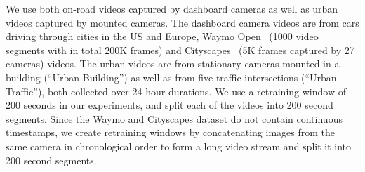 We use both on-road videos captured by dashboard cameras as well as urban videos captured by mounted cameras. The dashboard camera videos are from cars driving through cities in the US and Europe, Waymo Open~\cite{waymo} (1000 video segments with in total 200K frames) and Cityscapes~\cite{cityscapes} (5K frames captured by 27 cameras) videos. The urban videos are from stationary cameras mounted in a building (``Urban Building'') as well as from five traffic intersections (``Urban Traffic''), both collected over 24-hour durations. %
We use a retraining window of 200 seconds in our experiments, and split each of the videos into 200 second segments.  
Since the Waymo and Cityscapes dataset do not contain continuous timestamps, we 
create retraining windows by concatenating images from the same camera in chronological order to form a long video stream and split it into 200 second segments. %


